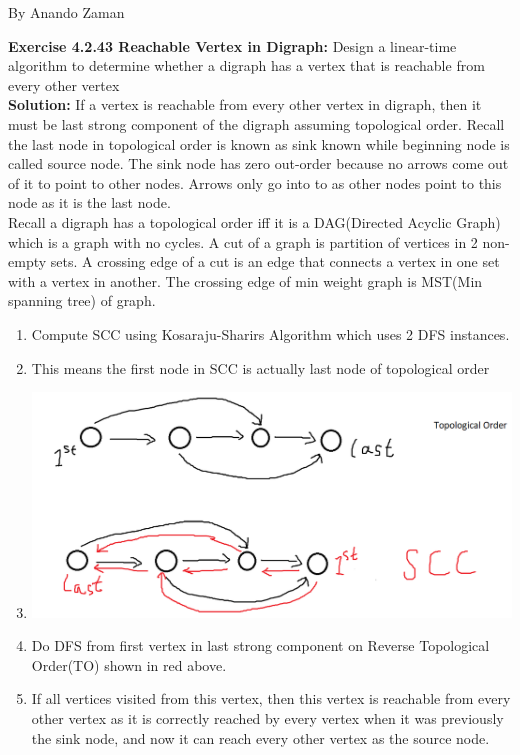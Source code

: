 \documentclass[11pt,fleqn]{article}
\newcommand{\be}{\begin{enumerate}}
\newcommand{\ee}{\end{enumerate}}
\begin{document}
By Anando Zaman


\textbf{Exercise 4.2.43 Reachable Vertex in Digraph:} Design a linear-time algorithm to determine whether a digraph has a vertex that is reachable from every other vertex\\

\textbf{Solution:} If a vertex is reachable from every other vertex in digraph, then it must be last strong component of the digraph assuming topological order. Recall the last node in topological order is known as sink known while beginning node is called source node. The sink node has zero out-order because no arrows come out of it to point to other nodes. Arrows only go into to as other nodes point to this node as it is the last node.\\

Recall a digraph has a topological order iff it is a DAG(Directed Acyclic Graph) which is a graph with no cycles. A cut of a graph is partition of vertices in 2 non-empty sets. A crossing edge of a cut is an edge that connects a vertex in one set with a vertex in another. The crossing edge of min weight graph is MST(Min spanning tree) of graph.

\be
	\item Compute SCC using Kosaraju-Sharirs Algorithm which uses 2 DFS instances.
	\item This means the first node in SCC is actually last node of topological order
	\item \includegraphics[scale=0.4]{4.2.43.png}
	\item Do DFS from first vertex in last strong component on Reverse Topological Order(TO) shown in red above.
	\item If all vertices visited from this vertex, then this vertex is reachable from every other vertex as it is correctly reached by every vertex when it was previously the sink node, and now it can reach every other vertex as the source node.
\ee
\end{document}
